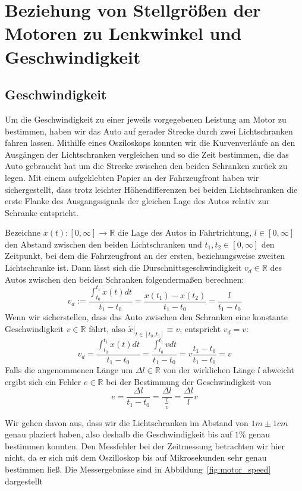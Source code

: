 \section{Beziehung von Stellgrößen der Motoren zu Lenkwinkel und Geschwindigkeit}
\subsection{Geschwindigkeit}
Um die Geschwindigkeit zu einer jeweils vorgegebenen Leistung am Motor zu bestimmen, haben wir das Auto auf gerader Strecke durch zwei Lichtschranken fahren lassen. Mithilfe eines Osziloskops konnten wir die Kurvenverläufe an den Ausgängen der Lichtschranken vergleichen und so die Zeit bestimmen, die das Auto gebraucht hat um die Strecke zwischen den beiden Schranken zurück zu legen. Mit einem aufgeklebten Papier an der Fahrzeugfront haben wir sichergestellt, dass trotz leichter Höhendifferenzen bei beiden Lichtschranken die erste Flanke des Ausgangssignals der gleichen Lage des Autos relativ zur Schranke entspricht.

Bezeichne $x(t): [0,\infty]\rightarrow \mathbb{R}$ die Lage des Autos in Fahrtrichtung, $l\in[0,\infty]$ den Abstand zwischen den beiden Lichtschranken und $t_1, t_2\in [0,\infty]$ den Zeitpunkt, bei dem die Fahrzeugfront an der ersten, beziehungsweise zweiten Lichtschranke ist. Dann lässt sich die Durschnittsgeschwindigkeit $v_d\in\mathbb{R}$ des Autos zwischen den beiden Schranken folgendermaßen berechnen:
\begin{equation*}
v_d := \frac{\int_{t_0}^{t_1}{\dot x(t) dt}}{t_1-t_0}=\frac{x(t_1)-x(t_2)}{t_1-t_0}=\frac{l}{t_1-t_0}
\end{equation*}
Wenn wir sicherstellen, dass das Auto zwischen den Schranken eine konstante Geschwindigkeit $v\in\mathbb{R}$ fährt, also $\dot x\vert_{t\in[t_0,t_1]}\equiv v$, entspricht $v_d=v$:
\begin{equation*}
v_d = \frac{\int_{t_0}^{t_1}{\dot x(t) dt}}{t_1-t_0} = \frac{\int_{t_0}^{t_1}{v dt}}{t_1-t_0}=v\frac{t_1-t_0}{t_1-t_0}=v
\end{equation*}
Falls die angenommenen Länge um $\Delta l\in\mathbb{R}$ von der wirklichen Länge $l$ abweicht ergibt sich ein Fehler $e\in \mathbb{R}$ bei der Bestimmung der Geschwindigkeit von
\begin{equation*}
	e = \frac{\Delta l}{t_1-t_0} = \frac{\Delta l}{\frac{l}{v}} = \frac{\Delta l}{l}v
\end{equation*}

Wir gehen davon aus, dass wir die Lichtschranken im Abstand von $1m\pm1cm$ genau plaziert haben, also deshalb die Geschwindigkeit bis auf $1\%$ genau bestimmen konnten. Den Messfehler bei der Zeitmessung betrachten wir hier nicht, da er sich mit dem Oszilloskop bis auf Mikrosekunden sehr genau bestimmen ließ. Die Messergebnisse sind in Abbildung~\ref{fig:motor_speed} dargestellt



